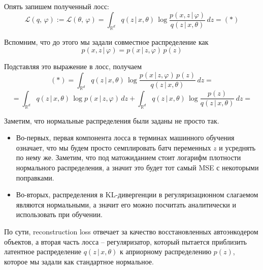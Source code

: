 \documentclass[12pt]{article}
\def\R{\mathbb{R}}       %
\theoremstyle{definition} %
\theoremstyle{plain} %
\theoremstyle{remark} %
\begin{document}
    \pagebreak

    Опять запишем полученный лосс:
    \[
    \mathcal{L}(q, \, \varphi) := \mathcal{L}(\theta, \, \varphi) = \int_{\R^d} q(z \, | \, x, \theta) \, \log\frac{p(x, z \, | \, \varphi)}{q(z \, | \, x, \theta)} \, dz = (*)
    \]

    Вспомним, что до этого мы задали совместное распределение как
    \[
    p(x, z \, | \, \varphi) = p(x \, | \, z, \varphi) \, p(z)
    \]

    Подставляя это выражение в лосс, получаем
    \[
    (*) = \int_{\R^d} q(z \, | \, x, \theta) \, \log\frac{p(x \, | \, z, \varphi) \, p(z)}{q(z \, | \, x, \theta)} \, dz = 
    \]
    \[
    = \int_{\R^d} q(z \, | \, x, \theta) \, \log p(x \, | \, z, \varphi) \, dz + 
    \int_{\R^d} q(z \, | \, x, \theta) \, \log\frac{p(z)}{q(z \, | \, x, \theta)} \, dz = 
    \]
\begin{center}
\end{center}

    Заметим, что нормальные распределения были заданы не просто так.
    \begin{itemize}
        \item Во-первых, первая компонента лосса в терминах машинного обучения означает, что мы будем просто семплировать батч переменных $z$ и усреднять по нему же. Заметим, что под матожиданием стоит логарифм плотности нормального распределения, а значит это будет тот самый MSE с некоторыми поправками.
        \item Во-вторых, распределения в KL-дивергенции в регуляризационном слагаемом являются нормальными, а значит его можно посчитать аналитически и использовать при обучении.
    \end{itemize}

    По сути, reconstruction loss отвечает за качество восстановленных автоэнкодером объектов, а вторая часть лосса -- регуляризатор, который пытается приблизить латентное распределение $q(z \, | \, x, \theta)$ к априорному распределению $p(z)$, которое мы задали как стандартное нормальное. \\
\end{document}
